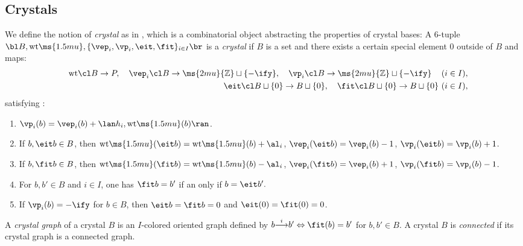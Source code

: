 \documentclass[12pt,leqno]{amsart}%
\theoremstyle{plain}
\theoremstyle{definition}
\newcommand{\Z}{\ms{2mu}{\mathbb Z}}
\newcommand{\wt}{\mathrm{wt}\ms{1.5mu}} 		%
\def\mapright#1{\smash{\mathop{\longrightarrow}\limits^{#1}}}
\numberwithin{equation}{section}
\begin{document}
\subsection{Crystals}
We define the notion of {\em crystal} as in \cite{Kas93}, which is 
a combinatorial object abstracting the properties of crystal bases:
\label{cryst}
A 6-tuple $\bl B,\wt, \{\vep_i,\vp_i, \eit,\fit\}_{i\in I}\br$ is 
a {\em crystal} if $B$ is a set and there exists a certain special element 
$0$ outside of $B$ and maps:
\begin{eqnarray}
&&{\rm wt}\cl B\to P,\label{wtp-c}\quad
\vep_i\cl B\to\Z\sqcup\{-\ify\},\quad\vp_i\cl B\to\Z\sqcup\{-\ify\}\quad\,(i\in I),
\\
&&\eit\cl B\sqcup\{0\}\to B\sqcup\{0\},\quad
\fit\cl B\sqcup\{0\}\to B\sqcup\{0\}\,\,(i\in I),\label{eitfit-c}
\end{eqnarray}
satisfying :
\begin{enumerate}
\item
$\vp_i(b)=\vep_i(b)+\lan h_i,\wt(b)\ran$.
\item
If  $b,\eit b\in B$, then $\wt(\eit b)=\wt(b)+\al_i$, 
$\vep_i(\eit b)=\vep_i(b)-1$, $\vp_i(\eit b)=\vp_i(b)+1$.
\item
If $b,\fit b\in B$, then $\wt(\fit b)=\wt(b)-\al_i$, 
$\vep_i(\fit b)=\vep_i(b)+1$, $\vp_i(\fit b)=\vp_i(b)-1$.
\item
For $b,b'\in B$ and $i\in I$, one has 
$\fit b=b'$ if an only if  $b=\eit b'.$
\item
If $\vp_i(b)=-\ify$ for $b\in B$, then $\eit b=\fit b=0$
and $\eit(0)=\fit(0)=0$.
\end{enumerate}
\edf

\Def\label{def:graph}
A {\em crystal graph} of a crystal $B$ is an $I$-colored 
oriented graph defined by $b\mapright{i} b'\Leftrightarrow \fit(b)=b'$ for $b,b'\in B$.
A crystal $B$ is {\em connected} if its crystal graph is a connected graph. 
\edf
\end{document}
